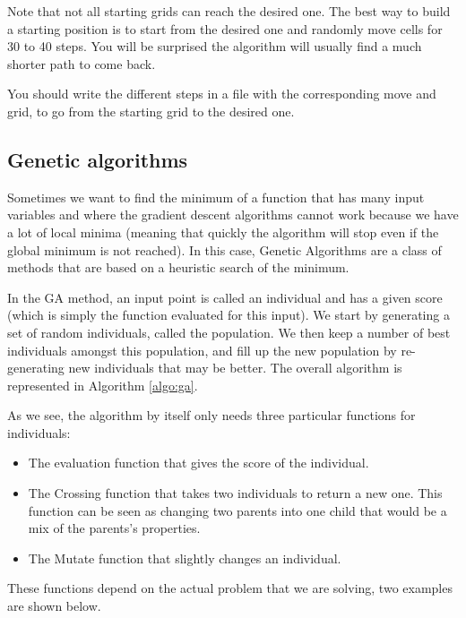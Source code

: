 \documentclass{ecnreport}
\begin{document}
Note that not all starting grids can reach the desired one. The best way to build a starting position is to start from the desired one and randomly move cells
for 30 to 40 steps. You will be surprised the algorithm will usually find a much shorter path to come back.

You should write the different steps in a file with the corresponding move and grid, to go from the starting grid to the desired one.

\subsection{Genetic algorithms}


Sometimes we want to find the minimum of a function that has many input variables and where the gradient descent algorithms cannot work because we have a lot of local minima (meaning that quickly the algorithm will stop even if the global minimum is not reached). In this case, Genetic Algorithms are a class of methods that are based on a heuristic search of the minimum. 

In the GA method, an input point is called an individual and has a given score (which is simply the function evaluated for this input). We start by generating a set of random individuals, called the population. We then keep a number of best individuals amongst this population, and fill up the new population by re-generating new individuals that may be better. The overall algorithm is represented in Algorithm \ref{algo:ga}.

As we see, the algorithm by itself only needs three particular functions for individuals:
\begin{itemize}
\item The evaluation function that gives the score of the individual.
\item The Crossing function that takes two individuals to return a new one. This function can be seen as changing two parents into one child that would be a mix of the parents's properties.
\item The Mutate function that slightly changes an individual.
\end{itemize}These functions depend on the actual problem that we are solving, two examples are shown below.

 \begin{itemize}
 \end{itemize}
\end{document}
